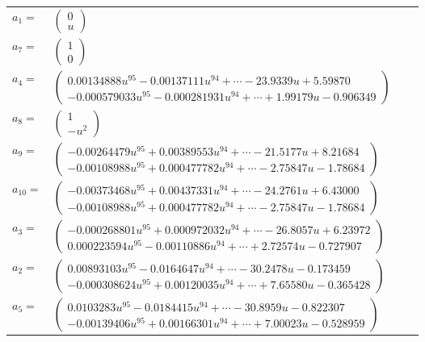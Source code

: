 \documentclass[1p]{elsarticle_modified}
\theoremstyle{definition}
\begin{document}
\begin{tabular}{m{7pt} m{180pt} m{7pt} m{180pt} }
\flushright $a_{1}=$&$\begin{pmatrix}0\\u\end{pmatrix}$ \\
\flushright $a_{7}=$&$\begin{pmatrix}1\\0\end{pmatrix}$ \\
\flushright $a_{4}=$&$\begin{pmatrix}0.00134888 u^{95}-0.00137111 u^{94}+\cdots-23.9339 u+5.59870\\-0.000579033 u^{95}-0.000281931 u^{94}+\cdots+1.99179 u-0.906349\end{pmatrix}$ \\
\flushright $a_{8}=$&$\begin{pmatrix}1\\- u^2\end{pmatrix}$ \\
\flushright $a_{9}=$&$\begin{pmatrix}-0.00264479 u^{95}+0.00389553 u^{94}+\cdots-21.5177 u+8.21684\\-0.00108988 u^{95}+0.000477782 u^{94}+\cdots-2.75847 u-1.78684\end{pmatrix}$ \\
\flushright $a_{10}=$&$\begin{pmatrix}-0.00373468 u^{95}+0.00437331 u^{94}+\cdots-24.2761 u+6.43000\\-0.00108988 u^{95}+0.000477782 u^{94}+\cdots-2.75847 u-1.78684\end{pmatrix}$ \\
\flushright $a_{3}=$&$\begin{pmatrix}-0.000268801 u^{95}+0.000972032 u^{94}+\cdots-26.8057 u+6.23972\\0.000223594 u^{95}-0.00110886 u^{94}+\cdots+2.72574 u-0.727907\end{pmatrix}$ \\
\flushright $a_{2}=$&$\begin{pmatrix}0.00893103 u^{95}-0.0164647 u^{94}+\cdots-30.2478 u-0.173459\\-0.000308624 u^{95}+0.00120035 u^{94}+\cdots+7.65580 u-0.365428\end{pmatrix}$ \\
\flushright $a_{5}=$&$\begin{pmatrix}0.0103283 u^{95}-0.0184415 u^{94}+\cdots-30.8959 u-0.822307\\-0.00139406 u^{95}+0.00166301 u^{94}+\cdots+7.00023 u-0.528959\end{pmatrix}$ \\

\end{tabular}
\end{document}

